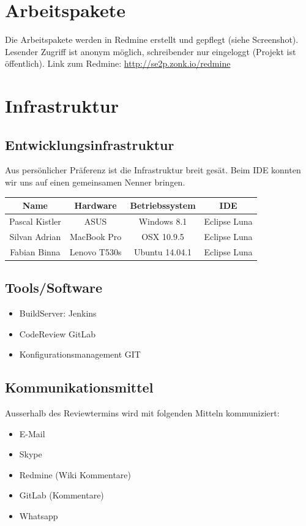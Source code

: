 \documentclass[11pt]{scrartcl}
\begin{document}
\section{Arbeitspakete}
\label{sec:Arbeitspakete}
Die Arbeitspakete werden in Redmine erstellt und gepflegt (siehe Screenshot). Lesender Zugriff ist anonym möglich, schreibender nur eingeloggt (Projekt ist öffentlich).
Link zum Redmine: \href{http://se2p.zonk.io/redmine}{http://se2p.zonk.io/redmine}

\section{Infrastruktur}
\label{sec:Infrastruktur}

\subsection{Entwicklungsinfrastruktur}
\label{sec:Entwicklungsinfrastruktur}
Aus persönlicher Präferenz ist die Infrastruktur breit gesät. Beim IDE konnten wir uns auf einen gemeinsamen Nenner bringen.

\begin{tabularx}{\textwidth}{c c c c}
\textbf{Name} & \textbf{Hardware} & \textbf{Betriebssystem} & \textbf{IDE} \\
\hline
Pascal Kistler & ASUS & Windows 8.1 & Eclipse Luna \\
\hline
Silvan Adrian & MacBook Pro & OSX 10.9.5 & Eclipse Luna \\
\hline
Fabian Binna & Lenovo T530s & Ubuntu 14.04.1 & Eclipse Luna \\
\hline
\end{tabularx}

\subsection{Tools/Software}
\label{sec:Tools/Software}
\begin{itemize}
    \item BuildServer: Jenkins
    \item CodeReview GitLab
    \item Konfigurationsmanagement GIT
\end{itemize}

\subsection{Kommunikationsmittel}
\label{sec:Kommunikationsmittel}
Ausserhalb des Reviewtermins wird mit folgenden Mitteln kommuniziert:
\begin{itemize}
    \item E-Mail
    \item Skype
    \item Redmine (Wiki Kommentare)
    \item GitLab (Kommentare)
    \item Whatsapp
\end{itemize}
\end{document}
